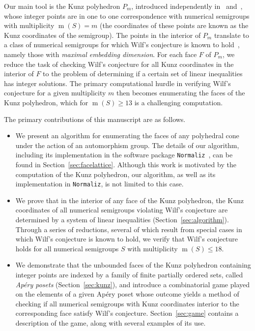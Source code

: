 \documentclass[12pt]{amsart}
\theoremstyle{definition}
\numberwithin{equation}{section}
\renewcommand\>{\rangle}
\newcommand\<{\langle}
\newcommand\0{\mathbf{0}}
\begin{document}
Our main tool is the Kunz polyhedron $P_m$, introduced independently in~\cite{kunz} and~\cite{kunz-coordinates}, whose integer points are in one to one correspondence with numerical semigroups with multiplicity $\operatorname m(S) = m$ (the coordinates of these points are known as the Kunz coordinates of the semigroup).  The points in the interior of $P_m$ translate to a class of numerical semigroups for which Wilf's conjecture is known to hold~\cite{kunz-coordinates}, namely those with \emph{maximal embedding dimension}.  For each face $F$ of $P_m$, we reduce the task of checking Wilf's conjecture for all Kunz coordinates in the interior of $F$ to the problem of determining if a certain set of linear inequalities has integer solutions.  The primary computational hurdle in verifying Wilf's conjecture for a given multiplicity $m$ then becomes enumerating the faces of the Kunz polyhedron, which for $\operatorname m(S) \ge 13$ is a challenging computation.  

The primary contributions of this manuscript are as follows.  

\begin{itemize}
\item 
We present an algorithm for enumerating the faces of any polyhedral cone under the action of an automorphism group.  The details of our algorithm, including its implementation in the software package \texttt{Normaliz}~\cite{Normaliz}, can be found in Section~\ref{sec:facelattice}.  Although this work is motivated by the computation of the Kunz polyhedron, our algorithm, as well as its implementation in \texttt{Normaliz}, is not limited to this case.  

\item 
We prove that in the interior of any face of the Kunz polyhedron, the Kunz coordinates of all numerical semigroups violating Wilf's conjecture are determined by a system of linear inequalities (Section~\ref{sec:algorithm}).  Through a series of reductions, several of which result from special cases in which Wilf's conjecture is known to hold, we verify that Wilf's conjecture holds for all numerical semigroups $S$ with multiplicity $\operatorname m(S) \le 18$.  

\item 
We demonstrate that the unbounded faces of the Kunz polyhedron containing integer points are indexed by a family of finite partially ordered sets, called \emph{Ap\'ery posets} (Section~\ref{sec:kunz}), and introduce a combinatorial game played on the elements of a given Ap\'ery poset whose outcome yields a method of checking if all numerical semigroups with Kunz coordinates interior to the corresponding face satisfy Wilf's conjecture.  Section~\ref{sec:game} contains a description of the game, along with several examples of its use.  

\end{itemize}
\end{document}
